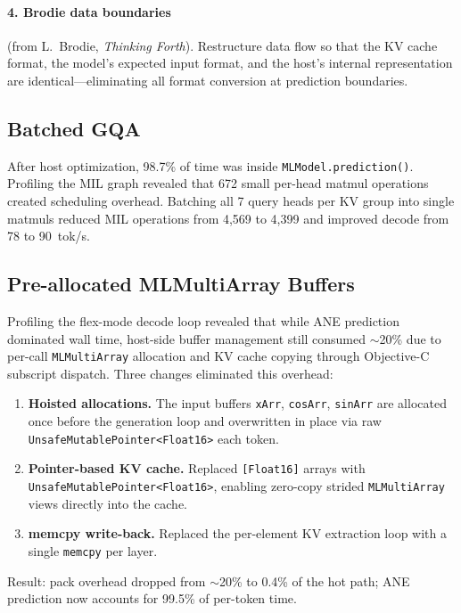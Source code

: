 \documentclass[11pt,twocolumn]{article}
\begin{document}
\paragraph{4. Brodie data boundaries} (from L.~Brodie,
\textit{Thinking Forth}). Restructure data flow so that the KV cache
format, the model's expected input format, and the host's internal
representation are identical---eliminating all format conversion at
prediction boundaries.

\subsection{Batched GQA}

After host optimization, 98.7\% of time was inside
\texttt{MLModel.prediction()}. Profiling the MIL graph revealed that
672 small per-head matmul operations created scheduling overhead.
Batching all 7 query heads per KV group into single matmuls reduced
MIL operations from 4,569 to 4,399 and improved decode from 78 to
90~tok/s.

\subsection{Pre-allocated MLMultiArray Buffers}

Profiling the flex-mode decode loop revealed that while ANE prediction
dominated wall time, host-side buffer management still consumed
$\sim$20\% due to per-call \texttt{MLMultiArray} allocation and KV
cache copying through Objective-C subscript dispatch. Three changes
eliminated this overhead:

\begin{enumerate}
\item \textbf{Hoisted allocations.} The input buffers \texttt{xArr},
  \texttt{cosArr}, \texttt{sinArr} are allocated once before the
  generation loop and overwritten in place via raw
  \texttt{UnsafeMutablePointer<Float16>} each token.
\item \textbf{Pointer-based KV cache.} Replaced \texttt{[Float16]}
  arrays with \texttt{UnsafeMutablePointer<Float16>}, enabling zero-copy
  strided \texttt{MLMultiArray} views directly into the cache.
\item \textbf{memcpy write-back.} Replaced the per-element KV
  extraction loop with a single \texttt{memcpy} per layer.
\end{enumerate}

Result: pack overhead dropped from $\sim$20\% to 0.4\% of the hot
path; ANE prediction now accounts for 99.5\% of per-token time.
\end{document}
